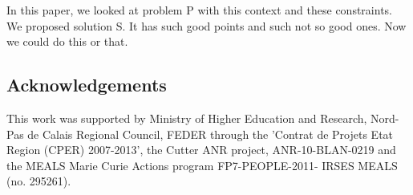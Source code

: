 \documentclass{article}
\begin{document}
In this paper, we \textsf{looked}\xspace at problem P with this context and these
constraints. We proposed solution S. It has such good points and such not so
good ones. Now we could do this or that.


%

\subsection*{Acknowledgements} This work was supported by Ministry of Higher Education and Research, Nord-Pas de Calais Regional Council, FEDER through the 'Contrat de
Projets Etat Region (CPER) 2007-2013',  the Cutter ANR project, ANR-10-BLAN-0219 and the MEALS Marie Curie Actions program FP7-PEOPLE-2011-
IRSES MEALS (no. 295261). 

% 
% 

% 



\end{document}
